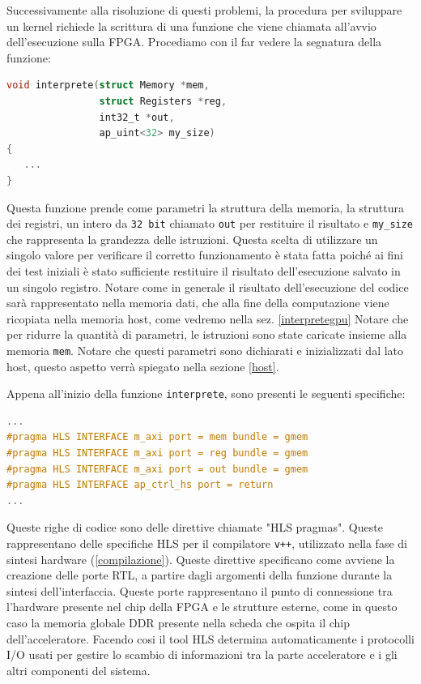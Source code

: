 \vspace{0.3cm}

\noindent Successivamente alla risoluzione di questi problemi, la procedura per sviluppare un kernel richiede la scrittura di una funzione che viene chiamata  all'avvio dell'esecuzione sulla FPGA. 
Procediamo con il far vedere la segnatura della funzione:
\begin{lstlisting}[language=C]
void interprete(struct Memory *mem, 
                struct Registers *reg, 
                int32_t *out, 
                ap_uint<32> my_size) 
{
   ...
}
\end{lstlisting}
Questa funzione prende come parametri la struttura della memoria, la struttura dei registri, un intero da \texttt{32 bit} chiamato \texttt{out} per restituire il risultato  e \texttt{my\_size} che rappresenta la grandezza delle istruzioni. Questa scelta di utilizzare un singolo valore per verificare il corretto funzionamento è stata fatta poiché ai fini dei test iniziali è stato sufficiente restituire il risultato dell'esecuzione salvato in un singolo registro.
Notare come in generale il risultato dell'esecuzione del codice sarà rappresentato nella memoria dati, che alla fine della computazione viene ricopiata nella memoria host, come vedremo nella sez. \ref{interpretegpu}
Notare che per ridurre la quantità di parametri, le istruzioni sono state caricate insieme alla memoria \texttt{mem}.
Notare che questi parametri sono dichiarati e inizializzati dal lato host, questo aspetto verrà spiegato nella sezione \ref{host}.

\vspace{0.3cm}

\noindent Appena all'inizio della funzione \texttt{interprete}, sono presenti le seguenti specifiche:

\begin{lstlisting}[language=C]
...
#pragma HLS INTERFACE m_axi port = mem bundle = gmem
#pragma HLS INTERFACE m_axi port = reg bundle = gmem
#pragma HLS INTERFACE m_axi port = out bundle = gmem
#pragma HLS INTERFACE ap_ctrl_hs port = return
...
\end{lstlisting}

Queste righe di codice sono delle direttive chiamate "HLS pragmas". Queste rappresentano delle specifiche HLS per il compilatore \texttt{v++}, utilizzato nella fase di sintesi hardware (\ref{compilazione}). Queste direttive specificano come avviene la creazione delle porte RTL, a partire dagli argomenti della funzione durante la sintesi dell'interfaccia. Queste porte rappresentano il punto di connessione tra l'hardware presente nel chip della FPGA e le strutture esterne, come in questo caso la memoria globale DDR presente nella scheda che ospita il chip dell'acceleratore.
Facendo cosi il tool HLS determina automaticamente i protocolli I/O usati per gestire lo scambio di informazioni tra la parte acceleratore e i gli altri componenti del sistema.

